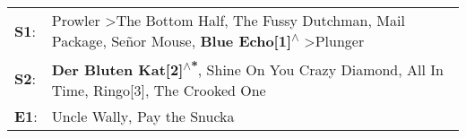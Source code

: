 \begin{supertabular}{p{0.03\textwidth}p{0.92\textwidth}}
 \textbf{S1}:  &  Prowler\textsuperscript{} \textgreater \enspace The Bottom Half\textsuperscript{}, \enspace The Fussy Dutchman\textsuperscript{}, \enspace Mail Package\textsuperscript{}, \enspace Señor Mouse\textsuperscript{}, \enspace \textbf{Blue Echo[1]\textsuperscript{$\wedge$}} \textgreater \enspace Plunger\textsuperscript{}  \enspace  \\
 \textbf{S2}:  &                                                                                        \textbf{Der Bluten Kat[2]\textsuperscript{$\wedge$*}}, \enspace Shine On You Crazy Diamond\textsuperscript{}, \enspace All In Time\textsuperscript{}, \enspace Ringo[3]\textsuperscript{}, \enspace The Crooked One\textsuperscript{}  \enspace  \\
 \textbf{E1}:  &                                                                                                                                                                                                                                                     Uncle Wally\textsuperscript{}, \enspace Pay the Snucka\textsuperscript{}  \enspace  \\
\end{supertabular}
